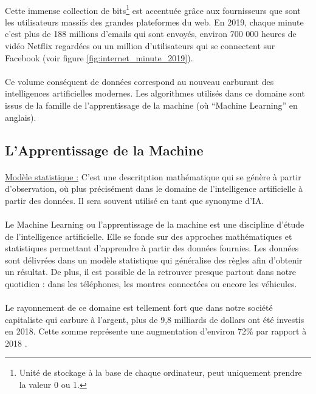 \documentclass[10pt, french, a4paper]{report}
\begin{document}
\paragraph{}
Cette immense collection de bits\footnote{Unité de stockage à la base de chaque ordinateur, peut uniquement prendre la valeur 0 ou 1.} est accentuée grâce aux fournisseurs que sont les utilisateurs massifs des grandes plateformes du web. En 2019, chaque minute c'est plus de 188 millions d'emails qui sont envoyés, environ 700 000 heures de vidéo Netflix regardées ou un million d'utilisateurs qui se connectent sur Facebook (voir figure \ref{fig:internet_minute_2019}).


\paragraph{}
Ce volume conséquent de données correspond au nouveau carburant des intelligences artificielles modernes. Les algorithmes utilisés dans ce domaine sont issus de la famille de l'apprentissage de la machine (où ``Machine Learning'' en anglais).

\subsection{L'Apprentissage de la Machine}

\paragraph{}
\underline{Modèle statistique :} C’est une descritption mathématique qui se génère à partir d’observation, où plus précisément dans le domaine de l’intelligence artificielle à partir des données. Il sera souvent utilisé en tant que synonyme d’IA.

\paragraph{}
Le Machine Learning ou l'apprentissage de la machine est une discipline d'étude de l'intelligence artificielle. Elle se fonde sur des approches mathématiques et statistiques permettant d'apprendre à partir des données fournies. Les données sont délivrées dans un modèle statistique qui généralise des règles afin d'obtenir un résultat. De plus, il est possible de la retrouver presque partout dans notre quotidien : dans les téléphones, les montres connectées ou encore les véhicules.

\paragraph{}
Le rayonnement de ce domaine est tellement fort que dans notre société capitaliste qui carbure à l'argent, plus de 9,8 milliards de dollars ont été investis en 2018. Cette somme représente une augmentation d'environ 72\% par rapport à 2018 \citep{columbus_25_2019}.
\end{document}
